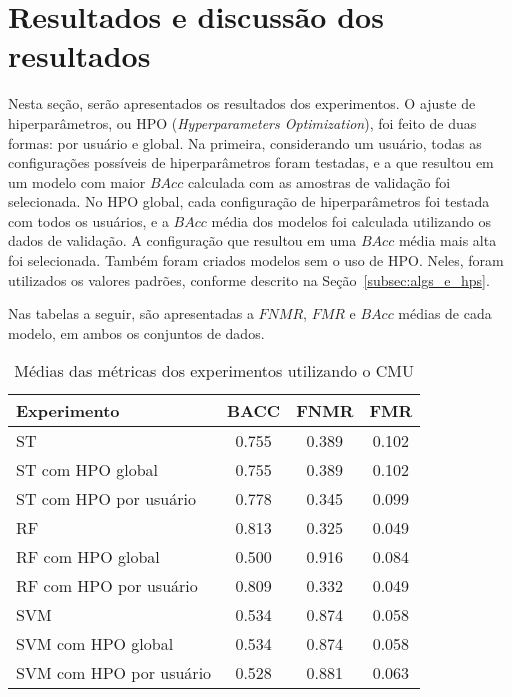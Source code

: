 \section{Resultados e discussão dos resultados}\label{sec:resultados}

Nesta seção, serão apresentados os resultados dos experimentos. O ajuste de hiperparâmetros, ou HPO (\textit{Hyperparameters Optimization}), foi feito de duas formas: por usuário e global. Na primeira, considerando um usuário, todas as configurações possíveis de hiperparâmetros foram testadas, e a que resultou em um modelo com maior $BAcc$ calculada com as amostras de validação foi selecionada. No HPO global, cada configuração de hiperparâmetros foi testada com todos os usuários, e a $BAcc$ média dos modelos foi calculada utilizando os dados de validação. A configuração que resultou em uma $BAcc$ média mais alta foi selecionada. Também foram criados modelos sem o uso de HPO. Neles, foram utilizados os valores padrões, conforme descrito na Seção~\ref{subsec:algs_e_hps}.

Nas tabelas a seguir, são apresentadas a $FNMR$, $FMR$ e $BAcc$ médias de cada modelo, em ambos os conjuntos de dados. 

\begin{table}[htbp]
\centering
\caption{Médias das métricas dos experimentos utilizando o CMU}\label{tab:exp_metric_averages_cmu}
\begin{tabular}{|l|c|c|c|}
\hline
\textbf{Experimento} & \textbf{BACC} & \textbf{FNMR} & \textbf{FMR} \\
\hline
ST & 0.755 & 0.389 & 0.102 \\
\hline
ST com HPO global & 0.755 & 0.389 & 0.102 \\
\hline
ST com HPO por usuário & 0.778 & 0.345 & 0.099 \\
\hline
RF & 0.813 & 0.325 & 0.049 \\
\hline
RF com HPO global & 0.500 & 0.916 & 0.084 \\
\hline
RF com HPO por usuário & 0.809 & 0.332 & 0.049 \\
\hline
SVM & 0.534 & 0.874 & 0.058 \\
\hline
SVM com HPO global & 0.534 & 0.874 & 0.058 \\
\hline
SVM com HPO por usuário & 0.528 & 0.881 & 0.063 \\
\hline
\end{tabular}
\end{table}

